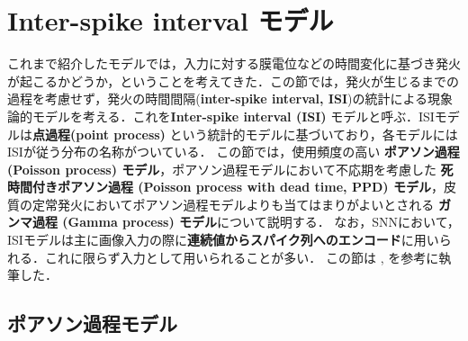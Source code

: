 \section{Inter-spike interval モデル}
これまで紹介したモデルでは，入力に対する膜電位などの時間変化に基づき発火が起こるかどうか，ということを考えてきた．この節では，発火が生じるまでの過程を考慮せず，発火の時間間隔(\textbf{inter-spike interval, ISI})の統計による現象論的モデルを考える．これを\textbf{Inter-spike interval (ISI)} モデルと呼ぶ．ISIモデルは\textbf{点過程(point process)} という統計的モデルに基づいており，各モデルにはISIが従う分布の名称がついている．
この節では，使用頻度の高い \textbf{ポアソン過程 (Poisson process) モデル}，ポアソン過程モデルにおいて不応期を考慮した \textbf{死時間付きポアソン過程 (Poisson process with dead time, PPD) モデル}，皮質の定常発火においてポアソン過程モデルよりも当てはまりがよいとされる \textbf{ガンマ過程 (Gamma process) モデル}について説明する．
なお，SNNにおいて，ISIモデルは主に画像入力の際に\textbf{連続値からスパイク列へのエンコード}に用いられる．これに限らず入力として用いられることが多い．
この節は \citep{Shimazaki_undated-ko}, \citep{Pachitariu2010-pm} を参考に執筆した．
\subsection{ポアソン過程モデル}
